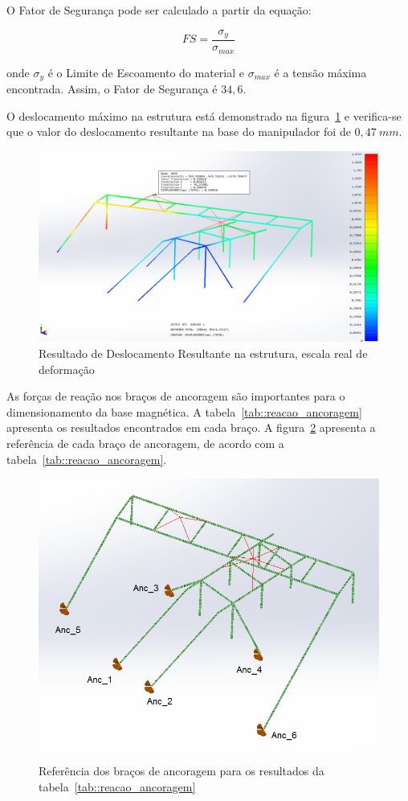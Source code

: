 O Fator de Segurança pode ser calculado a partir da equação: 

\begin{equation*}
	FS=\frac{\sigma _y}{\sigma _{max}}
\end{equation*}

onde $\sigma_y$ é o Limite de Escoamento do material e $\sigma_{max}$ é a tensão
máxima encontrada. Assim, o Fator de Segurança é $34,6$.

O deslocamento máximo na estrutura está demonstrado na
figura~\ref{fig::deslocamento} e verifica-se que o valor do deslocamento
resultante na base do manipulador foi de $0,47~mm$.

\begin{figure}[h!]
	\centering
	\includegraphics[width=0.9\columnwidth]{figs/dimensionamento/deslocamento}
	\caption{Resultado de Deslocamento Resultante na estrutura, escala real de
	deformação}
    \label{fig::deslocamento}
\end{figure}


As forças de reação nos braços de ancoragem são importantes para o
dimensionamento da base magnética. A tabela~\ref{tab::reacao_ancoragem}
apresenta os resultados encontrados em cada braço. A
figura~\ref{fig::mapa_forcas} apresenta a referência de cada braço de
ancoragem, de acordo com a tabela~\ref{tab::reacao_ancoragem}.

\begin{figure}[h!]
	\centering
	\includegraphics[width=0.8\columnwidth]{figs/dimensionamento/mapa_forcas}
	\caption{Referência dos braços de ancoragem para os resultados da
	tabela~\ref{tab::reacao_ancoragem}}
    \label{fig::mapa_forcas}
\end{figure}

